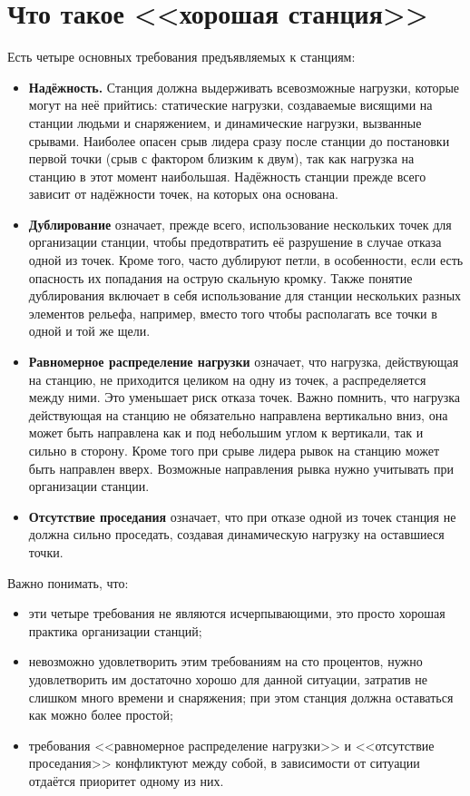 \documentclass[fleqn, 12pt]{extarticle}
\begin{document}
\section{Что такое <<хорошая станция>>}
	Есть четыре основных требования предъявляемых к станциям:
    \begin{itemize}
        \item \textbf{Надёжность.} Станция должна выдерживать всевозможные нагрузки, которые могут на неё прийтись: статические нагрузки, создаваемые висящими на станции людьми
                и снаряжением, и динамические нагрузки, вызванные срывами. Наиболее опасен срыв лидера сразу после станции до постановки первой точки (срыв с фактором близким к двум),
                так как нагрузка на станцию в этот момент наибольшая. Надёжность станции прежде всего зависит от надёжности точек, на которых она основана.
        \item \textbf{Дублирование} означает, прежде всего, использование нескольких точек для организации станции, чтобы предотвратить её разрушение в случае отказа одной из точек. 
                Кроме того, часто дублируют петли, в особенности, если есть опасность их попадания на острую скальную кромку. Также понятие дублирования включает в себя использование 
                для станции нескольких разных элементов рельефа, например, вместо того чтобы располагать все точки в одной и той же щели.
        \item \textbf{Равномерное распределение нагрузки} означает, что нагрузка, действующая на станцию, не приходится целиком на одну из точек, а распределяется между ними. 
                Это уменьшает риск отказа точек. Важно помнить, что нагрузка действующая на станцию не обязательно направлена вертикально вниз, она может быть направлена как 
                и под небольшим углом к вертикали, так и сильно в сторону. Кроме того при срыве лидера рывок на станцию может быть направлен вверх. Возможные направления рывка 
                нужно учитывать при организации станции.
        \item \textbf{Отсутствие проседания} означает, что при отказе одной из точек станция не должна сильно проседать, создавая динамическую нагрузку на оставшиеся точки.
    \end{itemize}
    
    Важно понимать, что:
    \begin{itemize}
        \item эти четыре требования не являются исчерпывающими, это просто хорошая практика организации станций;
        \item невозможно удовлетворить этим требованиям на сто процентов, нужно удовлетворить им достаточно хорошо для данной ситуации, затратив не слишком много времени и снаряжения; 
              при этом станция должна оставаться как можно более простой;
        \item требования <<равномерное распределение нагрузки>> и <<отсутствие проседания>> конфликтуют между собой, в зависимости от ситуации отдаётся приоритет одному из них.
    \end{itemize}
\end{document}
